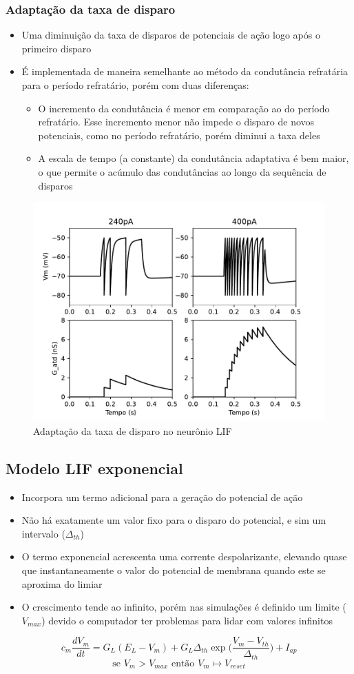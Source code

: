 \subsubsection{Adaptação da taxa de disparo}
\begin{itemize}
	\item Uma diminuição da taxa de disparos de potenciais de ação logo após o primeiro disparo
	\item É implementada de maneira semelhante ao método da condutância refratária para o período refratário, porém com duas diferenças:
	\begin{itemize}
		\item O incremento da condutância é menor em comparação ao do período refratário. Esse incremento menor não impede o disparo de novos potenciais, como no período refratário, porém diminui a taxa deles
		\item A escala de tempo (a constante) da condutância adaptativa é bem maior, o que permite o acúmulo das condutâncias ao longo da sequência de disparos
	\end{itemize}
\end{itemize}

\begin{figure}[htb!]
	\centering
	\caption{Adaptação da taxa de disparo no neurônio LIF}
	\label{fig:lifatd}
	\includegraphics[width=0.7\linewidth]{figs/lif_atd}
\end{figure}

\subsection{Modelo LIF exponencial}
\begin{itemize}
	\item Incorpora um termo adicional para a geração do potencial de ação
	\item Não há exatamente um valor fixo para o disparo do potencial, e sim um intervalo ($\Delta_{th}$)
	\item O termo exponencial acrescenta uma corrente despolarizante, elevando quase que instantaneamente o valor do potencial de membrana quando este se aproxima do limiar
	\item O crescimento tende ao infinito, porém nas simulações é definido um limite ($V_{max}$) devido o computador ter problemas para lidar com valores infinitos
\end{itemize}
$$
c_m\frac{dV_m}{dt} = G_L(E_L-V_m) + G_L\Delta_{th}\exp\Big(\frac{V_m-V_{th}}{\Delta_{th}}\Big) + I_{ap}
$$$$
\text{se } V_m > V_{max} \text{ então } V_m\mapsto V_{reset}
$$

